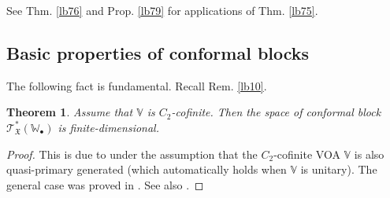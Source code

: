 \documentclass[11pt,b5paper,notitlepage]{article}
\theoremstyle{definition}
\theoremstyle{plain}
\newtheorem{thm}[df]{Theorem}
\newtheorem{co}[df]{Corollary}
\newcommand{\fk}{\mathfrak}
\newcommand{\End}{\mathrm{End}} %
\newcommand{\scr}{\mathscr}
\newcommand{\blt}{\bullet}
\newcommand{\Vbb}{\mathbb V}
\newcommand{\Wbb}{\mathbb W}
\numberwithin{equation}{section}
\begin{document}
\begin{comment}
We immediately obtain the following variant of \cite[Prop. 5.3]{CKLW18}. Note that if a $\Vbb$-module $\Wbb$ is irreducible then $\dim\End_\Vbb(\Wbb)=1$ (by a graded Schur lemma type argument), and the converse is true when $\Wbb$ is a completely reducible $\Vbb$-module (e.g. when $\Vbb$ is a unitary VOA and $\Wbb$ is a unitary $\Vbb$-module, cf. Def. \ref{lb78}).

\begin{co}\label{lb77}
Let $\Vbb$ be a VOA which is M\"obius unitarizable. Then $\dim\End_\Vbb(\Vbb)=1$ if and only if $\Vbb$ is of CFT-type. In particular, if $\Vbb$ is simple, then $\Vbb$ is of CFT-type.
\end{co}

We will apply Cor. \ref{lb77} to preunitary VOA extensions of a unitary VOA $\Vbb$, i.e., VOA extensions of $\Vbb$ which are unitary as $\Vbb$-modules.
\end{comment}


See Thm. \ref{lb76} and Prop. \ref{lb79} for applications of Thm. \ref{lb75}.






















\subsection{Basic properties of conformal blocks}

The following fact is fundamental. Recall Rem. \ref{lb10}.

\begin{thm}\label{lb11}
Assume that  $\Vbb$ is $C_2$-cofinite. Then the space of conformal block $\scr T^*_{\fk X}(\Wbb_\blt)$ is finite-dimensional.
\end{thm}

\begin{proof}
This is due to \cite{AN03} under the assumption that the $C_2$-cofinite VOA $\Vbb$ is also quasi-primary generated (which automatically holds when $\Vbb$ is unitary). The general case was proved in \cite[Prop. 5.1.1]{DGT23}. See also \cite[Thm. 7.4]{Gui23a}.
\end{proof}
\end{document}
